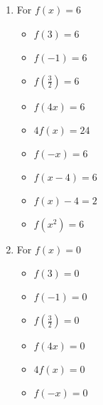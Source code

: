 \begin{enumerate}
\item For $f(x) = 6$ 

\begin{multicols}{3}
\begin{itemize}
\item $f(3) = 6$
\item $f(-1) =6$
\item $f\left(\frac{3}{2} \right) = 6$
\end{itemize}
\end{multicols}

\begin{multicols}{3}
\begin{itemize}
\item  $f(4x) = 6$
\item $4f(x) = 24$
\item $f(-x) = 6$
\end{itemize}
\end{multicols}

\begin{multicols}{3}
\begin{itemize}

\item  $f(x-4) = 6$ 

\item $f(x) - 4 = 2$
     
\item  $f\left(x^2\right) = 6$

\end{itemize}
\end{multicols}

\pagebreak

\item For $f(x) = 0$ 

\begin{multicols}{3}
\begin{itemize}
\item $f(3) = 0$
\item $f(-1) =0$
\item $f\left(\frac{3}{2} \right) = 0$
\end{itemize}
\end{multicols}

\begin{multicols}{3}
\begin{itemize}
\item  $f(4x) = 0$
\item $4f(x) = 0$
\item $f(-x) = 0$
\end{itemize}
\end{multicols}


\end{enumerate}
